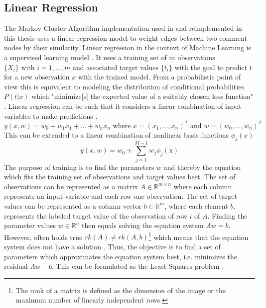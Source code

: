 \subsection{Linear Regression}
The Markov Cluster Algorithm implementation used in \cite{DBLP:conf/ecir/AkerKBPBHG16} and reimplemented in this thesis uses a linear regression model to weight edges between two comment nodes by their similarity. 
Linear regression in the context of Machine Learning is a supervised learning model \cite{Bishop:2006:PRM:1162264}. It uses a training set of $m$ observations $\{X_i\} \text{ with } i = 1,...,m$ and associated target values $\{t_i\}$ with the goal to predict $t$ for a new observation $x$ with the trained model. From a probabilistic point of view this is equivalent to modeling the distribution of conditional probabilities $P(t|x)$ \cite{Bishop:2006:PRM:1162264} which "minimize[s] the expected value of a suitably chosen loss function" \cite{Bishop:2006:PRM:1162264}. Linear regression can be such that it considers a linear combination of input variables to make predictions \cite{Bishop:2006:PRM:1162264}.
\begin{equation}
y(x,w) = w_0 + w_1x_1+ ... + w_nx_n \text{ where } x = (x_1,...,x_n)^T \text{ and } w = (w_0,...,w_n)^T
\end{equation} This can be extended to a linear combination of nonlinear basis functions $\phi_j(x)$ \cite{Bishop:2006:PRM:1162264}
\begin{equation}
y(x,w) = w_0 + \sum_{j=1}^{M-1} w_j\phi_j(\mathrm{x})
\end{equation}
The purpose of training is to find the parameters $w$ and thereby the equation which fits the training set of observations and target values best.
The set of observations can be represented as a matrix $A \in \mathbb{R}^{m \times n}$ where each column represents an input variable and each row one observation. The set of target values can be represented as a column-vector $b \in \mathbb{R}^m$, where each element $b_i$ represents the labeled target value of the observation of row $i$ of $A$. Finding the parameter values $w \in \mathbb{R}^n$ then equals solving the equation system $Aw = b$. However, often holds true $rk(A) \neq rk(A,b)$\footnote{The rank of a matrix is defined as the dimension of the image \cite{goetz} or the maximum number of linearly independent rows.} which means that the equation system does not have a solution \cite{goetz}. Thus, the objective is to find a set of parameters which approximates the equation system best, i.e. minimizes the residual $Aw - b$. This can be formulated as the Least Squares problem \cite{goetz}.
